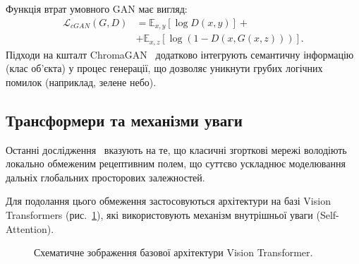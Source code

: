 \documentclass[]{iptconf}
\begin{document}
            Функція втрат умовного GAN має вигляд:
            \begin{align*}
                \mathcal{L}_{cGAN}(G,D) &= \mathbb{E}_{x,y}[\log D(x,y)] +\\
                                        &+ \mathbb{E}_{x,z}[\log(1-D(x,G(x,z)))].
            \end{align*}
            Підходи на кшталт ChromaGAN~\cite{2020-chromagan} додатково інтегрують семантичну інформацію (клас об'єкта) у процес генерації, що дозволяє уникнути грубих логічних помилок (наприклад, зелене небо).

        \subsection{Трансформери та механізми уваги}
            Останні дослідження~\cite{2021-colorization-transformer, 2022-unicolor} вказують на те, що класичні згорткові мережі володіють локально обмеженим рецептивним полем, що суттєво ускладнює моделювання дальніх глобальних просторових залежностей. 
                
            Для подолання цього обмеження застосовуються архітектури на базі Vision Transformers (рис.~\ref{fig:transformer}), які використовують механізм внутрішньої уваги (Self-Attention). 

            \begin{figure}[h]
                \centering
                \caption{Схематичне зображення базової архітектури Vision Transformer.}
                \label{fig:transformer}
            \end{figure}
\end{document}
